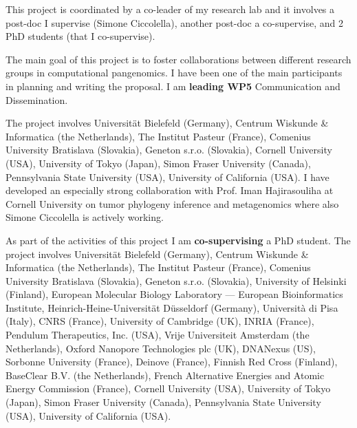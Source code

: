 \documentclass[11pt,a4paper,roman]{moderncv}
\begin{document}

This project is coordinated by a co-leader of my research lab and it involves a
post-doc I supervise (Simone Ciccolella), another post-doc a co-supervise, and 2
PhD students (that I co-supervise).

The main goal of this project is to foster collaborations between different
research groups in computational pangenomics.
I have been one of the main participants in planning and writing the proposal. I am
\textbf{leading WP5} Communication and Dissemination.

The project involves Universität Bielefeld (Germany), Centrum Wiskunde \& Informatica (the Netherlands), The
Institut Pasteur (France), Comenius University Bratislava (Slovakia), Geneton s.r.o.
(Slovakia), Cornell University (USA),  University of Tokyo (Japan),
Simon Fraser University (Canada), Pennsylvania State University (USA),
University of California (USA).
I have developed an especially strong collaboration with Prof. Iman Hajirasouliha at Cornell
University on tumor phylogeny inference and metagenomics where also Simone
Ciccolella is actively working.


As part of the activities of this project I am \textbf{co-supervising} a PhD student.
The project involves Universität Bielefeld (Germany), Centrum Wiskunde \& Informatica (the Netherlands), The
Institut Pasteur (France), Comenius University Bratislava (Slovakia), Geneton s.r.o.
(Slovakia), University of Helsinki (Finland), European Molecular Biology
Laboratory --- European Bioinformatics Institute,
Heinrich-Heine-Universität Düsseldorf (Germany),
Università di Pisa (Italy),
CNRS (France),
University of Cambridge (UK),
INRIA (France),
Pendulum Therapeutics, Inc. (USA),
Vrije Universiteit Amsterdam (the Netherlands),
Oxford Nanopore Technologies plc (UK),
DNANexus (US),
Sorbonne University (France),
Deinove (France),
Finnish Red Cross (Finland),
BaseClear B.V. (the Netherlands),
French Alternative Energies and Atomic Energy Commission (France),
Cornell University (USA),  University of Tokyo (Japan),
Simon Fraser University (Canada), Pennsylvania State University (USA),
University of California (USA).
\end{document}
